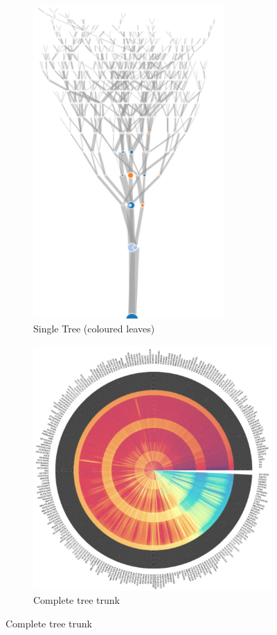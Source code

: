 \begin{figure}[H]
     \centering
     \begin{subfigure}[b]{0.495\textwidth}
         \centering
         \includegraphics[width=0.8\textwidth,height=\textwidth]{figures_c1/tree.png}
         \caption{Single Tree (coloured leaves)}
         \label{fig:1tree}
     \end{subfigure}
     \hfill
     \begin{subfigure}[b]{0.495\textwidth}
         \centering
         \includegraphics[width=\textwidth]{figures_c1/trunk.png}
         \caption{Complete tree trunk}
         \label{fig:trunk}
     \end{subfigure}
     

\end{figure}
